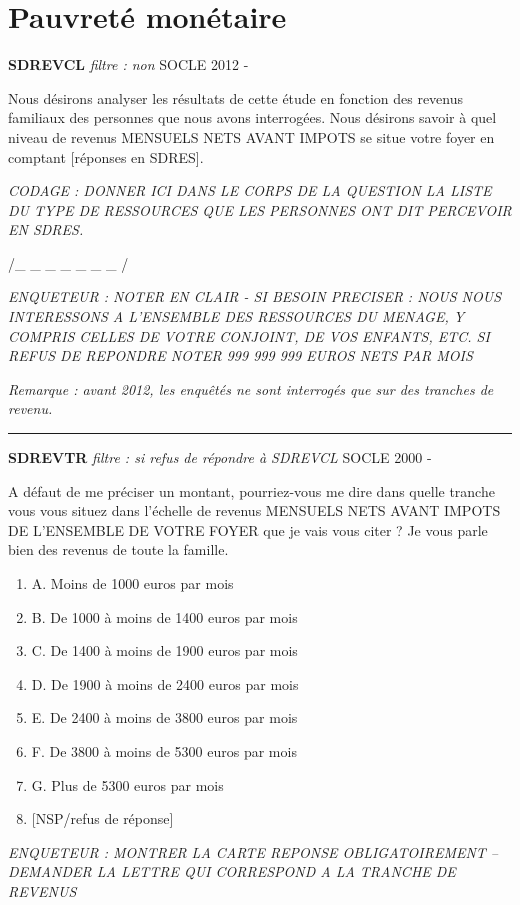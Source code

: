 \documentclass[12pt,a4paper]{reedthesis}
\providecommand{\tightlist}{%
  \setlength{\itemsep}{0pt}\setlength{\parskip}{0pt}}
\begin{document}
\hypertarget{pauvretuxe9-monuxe9taire}{%
\section{Pauvreté monétaire}\label{pauvretuxe9-monuxe9taire}}

\textbf{SDREVCL} \emph{filtre : non} SOCLE 2012 -

Nous désirons analyser les résultats de cette étude en fonction des revenus familiaux des personnes que nous avons interrogées.
Nous désirons savoir à quel niveau de revenus MENSUELS NETS AVANT IMPOTS se situe votre foyer en comptant {[}réponses en SDRES{]}.

\emph{CODAGE : DONNER ICI DANS LE CORPS DE LA QUESTION LA LISTE DU TYPE DE RESSOURCES QUE LES PERSONNES ONT DIT PERCEVOIR EN SDRES.}

/\_ \_ \_ \_ \_ \_ \_ /

\emph{ENQUETEUR : NOTER EN CLAIR - SI BESOIN PRECISER : NOUS NOUS INTERESSONS A L'ENSEMBLE DES RESSOURCES DU MENAGE, Y COMPRIS CELLES DE VOTRE CONJOINT, DE VOS ENFANTS, ETC. SI REFUS DE REPONDRE NOTER 999 999 999 EUROS NETS PAR MOIS}

\emph{Remarque : avant 2012, les enquêtés ne sont interrogés que sur des tranches de revenu.}
\begin{center}\rule{0.5\linewidth}{0.5pt}\end{center}

\textbf{SDREVTR} \emph{filtre : si refus de répondre à SDREVCL} SOCLE 2000 -

A défaut de me préciser un montant, pourriez-vous me dire dans quelle tranche vous vous situez dans l'échelle de revenus MENSUELS NETS AVANT IMPOTS DE L'ENSEMBLE DE VOTRE FOYER que je vais vous citer ? Je vous parle bien des revenus de toute la famille.
\begin{enumerate}
\def\labelenumi{\arabic{enumi}.}
\tightlist
\item
  A. Moins de 1000 euros par mois\\
\item
  B. De 1000 à moins de 1400 euros par mois\\
\item
  C. De 1400 à moins de 1900 euros par mois
\item
  D. De 1900 à moins de 2400 euros par mois\\
\item
  E. De 2400 à moins de 3800 euros par mois
\item
  F. De 3800 à moins de 5300 euros par mois
\item
  G. Plus de 5300 euros par mois
\item
  {[}NSP/refus de réponse{]}
\end{enumerate}
\emph{ENQUETEUR : MONTRER LA CARTE REPONSE OBLIGATOIREMENT -- DEMANDER LA LETTRE QUI CORRESPOND A LA TRANCHE DE REVENUS}
\end{document}

